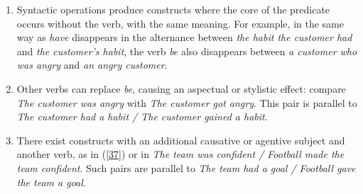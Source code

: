 \documentclass[output=paper]{langsci/langscibook}
\begin{document}
\renewcommand{\theenumi}{(\roman{enumi})}%
\begin{enumerate}
\item Syntactic operations produce constructs where the core of the predicate occurs without the verb, with the same meaning. For example, in the same way as \textit{have} disappears in the alternance between \textit{the habit the customer had} and \textit{the customer's habit}, the verb \textit{be} also disappears between \textit{a customer who was angry} and \textit{an angry customer}.

\item Other verbs can replace \textit{be}, causing an aspectual or stylistic effect: compare \textit{The customer was angry} with \textit{The customer got angry}. This pair is parallel to \textit{The customer had a habit / The customer gained a habit}.

\item There exist constructs with an additional causative or agentive subject and another verb, as in (\ref{37}) or in \textit{The team was confident / Football made the team confident}. Such pairs are parallel to \textit{The team had a goal / Football gave the team a goal}.
\end{enumerate}
\end{document}
